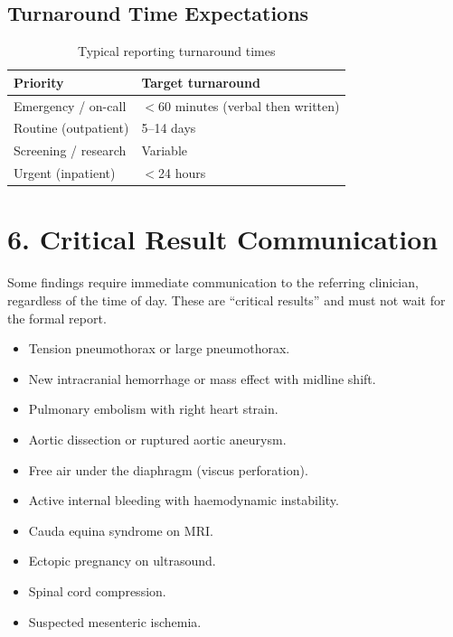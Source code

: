\subsection*{Turnaround Time Expectations}

\begin{table}[h]
\centering
\caption{Typical reporting turnaround times}
\begin{tabular}{|l|l|}
\hline
\textbf{Priority} & \textbf{Target turnaround} \\
\hline
Emergency / on-call & $<$60 minutes (verbal then written) \\
\hline
Routine (outpatient) & 5--14 days \\
\hline
Screening / research & Variable \\
\hline
Urgent (inpatient) & $<$24 hours \\
\hline
\end{tabular}
\end{table}


\section*{6. Critical Result Communication}
Some findings require immediate communication to the referring clinician, regardless of the time of day. These are ``critical results'' and must not wait for the formal report.

\begin{testbox}
\begin{itemize}
    \item Tension pneumothorax or large pneumothorax.
    \item New intracranial hemorrhage or mass effect with midline shift.
    \item Pulmonary embolism with right heart strain.
    \item Aortic dissection or ruptured aortic aneurysm.
    \item Free air under the diaphragm (viscus perforation).
    \item Active internal bleeding with haemodynamic instability.
    \item Cauda equina syndrome on MRI.
    \item Ectopic pregnancy on ultrasound.
    \item Spinal cord compression.
    \item Suspected mesenteric ischemia.
\end{itemize}
\end{testbox}

